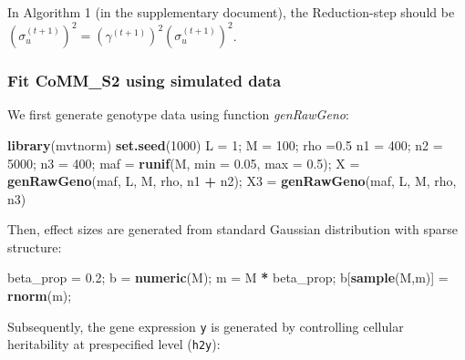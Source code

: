 \documentclass[]{article}
\newenvironment{Shaded}{\begin{snugshade}}{\end{snugshade}}
\newcommand{\KeywordTok}[1]{\textcolor[rgb]{0.13,0.29,0.53}{\textbf{#1}}}
\newcommand{\DataTypeTok}[1]{\textcolor[rgb]{0.13,0.29,0.53}{#1}}
\newcommand{\DecValTok}[1]{\textcolor[rgb]{0.00,0.00,0.81}{#1}}
\newcommand{\FloatTok}[1]{\textcolor[rgb]{0.00,0.00,0.81}{#1}}
\newcommand{\StringTok}[1]{\textcolor[rgb]{0.31,0.60,0.02}{#1}}
\newcommand{\OperatorTok}[1]{\textcolor[rgb]{0.81,0.36,0.00}{\textbf{#1}}}
\newcommand{\NormalTok}[1]{#1}
\begin{document}
In Algorithm 1 (in the supplementary document), the Reduction-step
should be
\(\left( \sigma_u^{(t+1)}\right)^2 = \left( \gamma^{(t+1)}\right)^2\left( \sigma_u^{(t+1)}\right)^2\).

\subsubsection{Fit CoMM\_S2 using simulated
data}\label{fit-comm_s2-using-simulated-data}

We first generate genotype data using function \emph{genRawGeno}:

\begin{Shaded}
\begin{Highlighting}[]
\KeywordTok{library}\NormalTok{(mvtnorm)}
\KeywordTok{set.seed}\NormalTok{(}\DecValTok{1000}\NormalTok{)}
\NormalTok{L =}\StringTok{ }\DecValTok{1}\NormalTok{; M =}\StringTok{ }\DecValTok{100}\NormalTok{; rho =}\FloatTok{0.5}
\NormalTok{n1 =}\StringTok{ }\DecValTok{400}\NormalTok{; n2 =}\StringTok{ }\DecValTok{5000}\NormalTok{; n3 =}\StringTok{ }\DecValTok{400}\NormalTok{;}
\NormalTok{maf =}\StringTok{ }\KeywordTok{runif}\NormalTok{(M, }\DataTypeTok{min =} \FloatTok{0.05}\NormalTok{, }\DataTypeTok{max =} \FloatTok{0.5}\NormalTok{);}
\NormalTok{X =}\StringTok{ }\KeywordTok{genRawGeno}\NormalTok{(maf, L, M, rho, n1 }\OperatorTok{+}\StringTok{ }\NormalTok{n2);}
\NormalTok{X3 =}\StringTok{ }\KeywordTok{genRawGeno}\NormalTok{(maf, L, M, rho, n3)}
\end{Highlighting}
\end{Shaded}

Then, effect sizes are generated from standard Gaussian distribution
with sparse structure:

\begin{Shaded}
\begin{Highlighting}[]
\NormalTok{beta_prop =}\StringTok{ }\FloatTok{0.2}\NormalTok{;}
\NormalTok{b =}\StringTok{ }\KeywordTok{numeric}\NormalTok{(M);}
\NormalTok{m =}\StringTok{ }\NormalTok{M }\OperatorTok{*}\StringTok{ }\NormalTok{beta_prop;}
\NormalTok{b[}\KeywordTok{sample}\NormalTok{(M,m)] =}\StringTok{ }\KeywordTok{rnorm}\NormalTok{(m);}
\end{Highlighting}
\end{Shaded}

Subsequently, the gene expression \texttt{y} is generated by controlling
cellular heritability at prespecified level (\texttt{h2y}):
\end{document}
